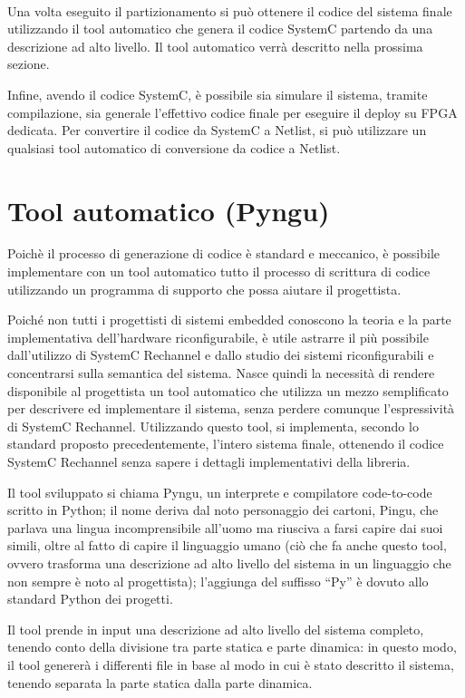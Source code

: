 \documentclass[a4paper,titlepage]{book}
\begin{document}
~ 

Una volta eseguito il partizionamento si può ottenere il codice del sistema finale utilizzando il tool automatico che genera il codice SystemC partendo da una descrizione ad alto livello. Il tool automatico verrà descritto nella prossima sezione.

Infine, avendo il codice SystemC, è possibile sia simulare il sistema, tramite compilazione, sia generale l'effettivo codice finale per eseguire il deploy su FPGA dedicata. Per convertire il codice da SystemC a Netlist, si può utilizzare un qualsiasi tool automatico di conversione da codice a Netlist.

\section{Tool automatico (Pyngu)}

Poichè il processo di generazione di codice è standard e meccanico, è possibile implementare con un tool automatico tutto il processo di scrittura di codice utilizzando un programma di supporto che possa aiutare il progettista. 

Poiché non tutti i progettisti di sistemi embedded conoscono la teoria e la parte implementativa dell'hardware riconfigurabile, è utile astrarre il più possibile dall'utilizzo di SystemC Rechannel e dallo studio dei sistemi riconfigurabili e concentrarsi sulla semantica del sistema. Nasce quindi la necessità di rendere disponibile al progettista un tool automatico che utilizza un mezzo semplificato per descrivere ed implementare il sistema, senza perdere comunque l'espressività di SystemC Rechannel. Utilizzando questo tool, si implementa, secondo lo standard proposto precedentemente, l'intero sistema finale, ottenendo il codice SystemC Rechannel senza sapere i dettagli implementativi della libreria.

Il tool sviluppato si chiama Pyngu, un interprete e compilatore code-to-code scritto in Python; il nome deriva dal noto personaggio dei cartoni, Pingu, che parlava una lingua incomprensibile all'uomo ma riusciva a farsi capire dai suoi simili, oltre al fatto di capire il linguaggio umano (ciò che fa anche questo tool, ovvero trasforma una descrizione ad alto livello del sistema in un linguaggio che non sempre è noto al progettista); l'aggiunga del suffisso ``Py'' è dovuto allo standard Python dei progetti.

Il tool prende in input una descrizione ad alto livello del sistema completo, tenendo conto della divisione tra parte statica e parte dinamica: in questo modo, il tool genererà i differenti file in base al modo in cui è stato descritto il sistema, tenendo separata la parte statica dalla parte dinamica.
\end{document}
